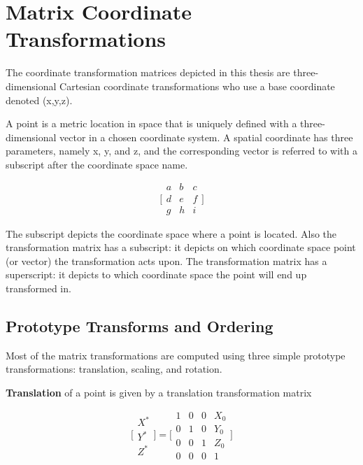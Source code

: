 \documentclass[12pt,a4paper,oneside,pdftex]{report}
\begin{document}
\section{Matrix Coordinate Transformations}

The coordinate transformation matrices depicted in this thesis are three-dimensional Cartesian coordinate transformations who use a base coordinate denoted (x,y,z).

A point is a metric location in space that is uniquely defined with a three-dimensional vector in a chosen coordinate system.
A spatial coordinate has three parameters, namely x, y, and z, and the corresponding vector is referred to with a subscript after the coordinate space name.

\begin{equation*}
\Biggl[ \begin{array}{ccc}
a & b & c \\
d & e & f \\
g & h & i \end{array} \Biggl]
\end{equation*}

The subscript depicts the coordinate space where a point is located. 
Also the transformation matrix has a subscript: it depicts on which coordinate space point (or vector) the transformation acts upon.
The transformation matrix has a superscript: it depicts to which coordinate space the point will end up transformed in.


\subsection{Prototype Transforms and Ordering}

Most of the matrix transformations are computed using three simple prototype transformations: translation, scaling, and rotation.

\textbf{Translation} of a point is given by a translation transformation matrix

\begin{equation}
\Biggl[ \begin{array}{c}
X^* \\
Y^* \\
Z^* \end{array} \Biggl]
= \Biggl[ \begin{array}{cccc}
1 & 0 & 0 & X_0 \\
0 & 1 & 0 & Y_0 \\
0 & 0 & 1 & Z_0 \\
0 & 0 & 0 & 1 \end{array} \Biggl]

\end{equation}
\end{document}

